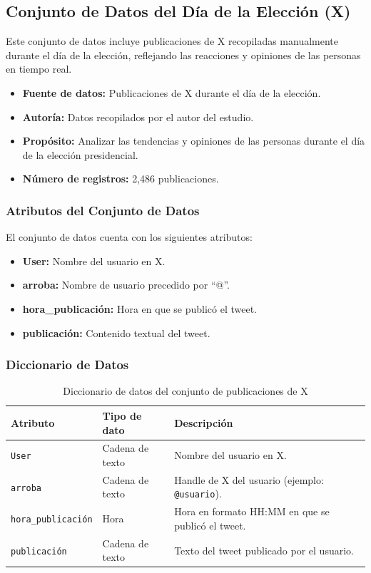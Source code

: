 \documentclass[10pt, a4paper]{article}
\begin{document}
    \subsection{Conjunto de Datos del Día de la Elección (X)}
    
    Este conjunto de datos incluye publicaciones de X recopiladas manualmente durante el día de la elección, reflejando las reacciones y opiniones de las personas en tiempo real.
    
    \begin{itemize}
    	\item \textbf{Fuente de datos:} Publicaciones de X durante el día de la elección.
    	\item \textbf{Autoría:} Datos recopilados por el autor del estudio.
    	\item \textbf{Propósito:} Analizar las tendencias y opiniones de las personas durante el día de la elección presidencial.
    	\item \textbf{Número de registros:} 2,486 publicaciones.
    \end{itemize}
    
    \subsubsection{Atributos del Conjunto de Datos}
    
    El conjunto de datos cuenta con los siguientes atributos:
    
    \begin{itemize}
    	\item \textbf{User:} Nombre del usuario en X.
    	\item \textbf{arroba:} Nombre de usuario precedido por ``@''.
    	\item \textbf{hora\_publicación:} Hora en que se publicó el tweet.
    	\item \textbf{publicación:} Contenido textual del tweet.
    \end{itemize}
    
    \subsubsection{Diccionario de Datos}
    
    \begin{table}[h]
    	\centering
    	\begin{tabular}{llp{9cm}}
    		\hline
    		\textbf{Atributo} & \textbf{Tipo de dato} & \textbf{Descripción} \\
    		\hline
    		\texttt{User} & Cadena de texto & Nombre del usuario en X. \\
    		\texttt{arroba} & Cadena de texto & Handle de X del usuario (ejemplo: \texttt{@usuario}). \\
    		\texttt{hora\_publicación} & Hora & Hora en formato HH:MM en que se publicó el tweet. \\
    		\texttt{publicación} & Cadena de texto & Texto del tweet publicado por el usuario. \\
    		\hline
    	\end{tabular}
    	\caption{Diccionario de datos del conjunto de publicaciones de X}
    \end{table}  
    
		
\end{document}
